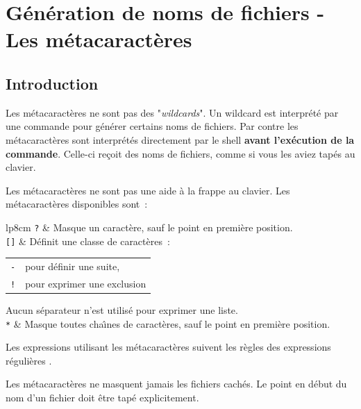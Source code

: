 \section{\label{basic-metacars}G{\'e}n{\'e}ration de noms de fichiers - Les m{\'e}tacaract{\`e}res}

\subsection{Introduction}

Les m{\'e}tacaract{\`e}res ne sont pas des
"\textsl{wildcards}". Un wildcard est
interpr{\'e}t{\'e} par une commande pour g{\'e}n{\'e}rer certains noms
de fichiers. Par contre les m{\'e}tacaract{\`e}res sont
interpr{\'e}t{\'e}s directement par le shell \textbf{avant
l'ex{\'e}cution de la commande}. Celle-ci re\c{c}oit des noms de
fichiers, comme si vous les aviez tap{\'e}s au clavier.

Les m{\'e}tacaract{\`e}res ne sont pas une aide {\`a} la frappe au clavier.
Les m{\'e}tacaract{\`e}res disponibles sont~:~\\
\begin{tabular}{lp{8cm}}
	\texttt{?}		&
	Masque un caract{\`e}re, sauf le point en premi{\`e}re position.\\[0.5cm]
	\texttt{[]}		&
	D{\'e}finit une classe de caract{\`e}res~:
	\begin{tabular}{lp{5cm}}
		\index{-@\texttt{-}}\texttt{-}	& pour d{\'e}finir une suite,\\
		\index{!@\texttt{!}}\texttt{!}	& pour exprimer une exclusion
	\end{tabular}
	Aucun s{\'e}parateur n'est utilis{\'e} pour exprimer une liste.\\[0.5cm]
	\texttt{*}		&
	Masque toutes cha{\^\i}nes de caract{\`e}res, sauf le point en premi{\`e}re position.
\end{tabular}

\begin{remarque}
Les expressions utilisant les m{\'e}tacaract{\`e}res suivent les r{\`e}gles des expressions r{\'e}guli{\`e}res
{\Unix}.
\end{remarque}

Les m{\'e}tacaract{\`e}res ne masquent jamais les fichiers cach{\'e}s. Le point en d{\'e}but du nom d'un
fichier doit {\^e}tre tap{\'e} explicitement.

